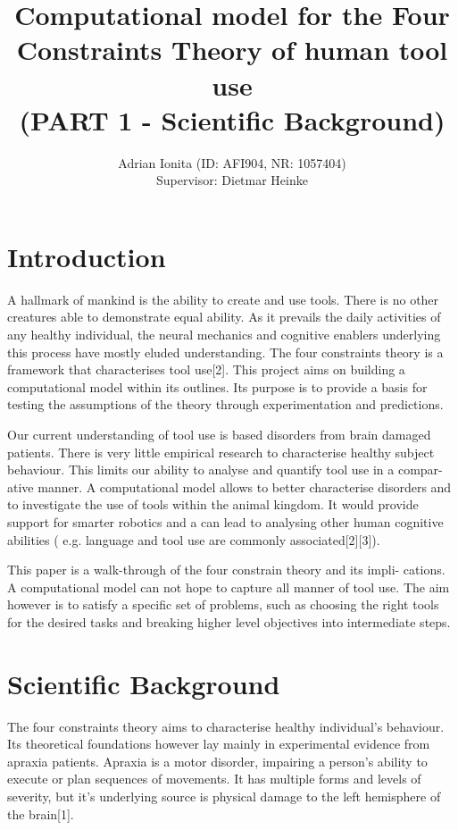 \documentclass[11]{article}
\title{
  Computational model for the Four Constraints Theory of human tool use\\  
  \setlength{\parskip}{0.5em}  
  \normalsize (PART 1 - Scientific Background)
  }
\date{}
\author{Adrian Ionita (ID: AFI904, NR: 1057404)\\
Supervisor: Dietmar Heinke}
\begin{document}
\maketitle 	

\section*{Introduction} 

A hallmark of mankind is the ability to create and use tools. There is no other creatures able to demonstrate equal ability. As it prevails the daily activities of any healthy individual, the neural mechanics and cognitive enablers underlying this process have mostly eluded understanding. The four constraints theory is a framework that characterises tool use[2]. This project aims on building a computational model within its outlines. Its purpose is to provide a basis for testing the assumptions of the theory through experimentation and predictions.

Our current understanding of tool use is based disorders from brain damaged patients. There is very little empirical research to characterise healthy subject behaviour. This limits our ability to analyse and quantify tool use in a compar- ative manner. A computational model allows to better characterise disorders and to investigate the use of tools within the animal kingdom. It would provide support for smarter robotics and a can lead to analysing other human cognitive abilities ( e.g. language and tool use are commonly associated[2][3]).

This paper is a walk-through of the four constrain theory and its impli- cations. A computational model can not hope to capture all manner of tool use. The aim however is to satisfy a specific set of problems, such as choosing the right tools for the desired tasks and breaking higher level objectives into intermediate steps.

\section*{Scientific Background}
The four constraints theory aims to characterise healthy individual’s behaviour. Its theoretical foundations however lay mainly in experimental evidence from apraxia patients. Apraxia is a motor disorder, impairing a person’s ability to execute or plan sequences of movements. It has multiple forms and levels of severity, but it’s underlying source is physical damage to the left hemisphere of the brain[1].
\end{document}
